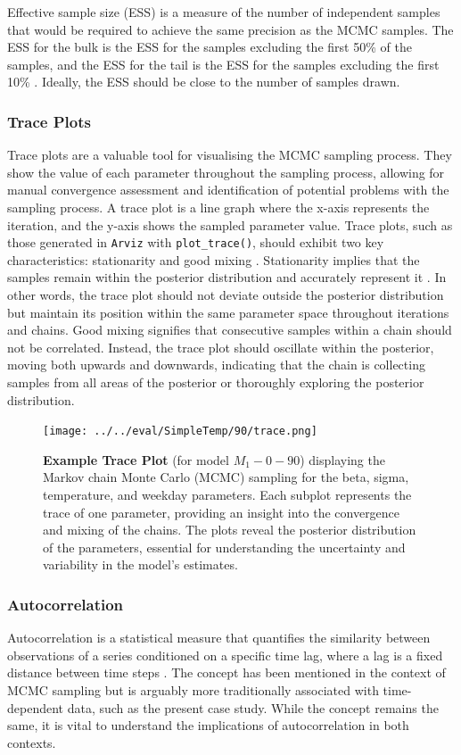 Effective sample size (ESS) is a measure of the number of independent samples
that would be required to achieve the same precision as the MCMC samples. The
ESS for the bulk is the ESS for the samples excluding the first 50\% of the
samples, and the ESS for the tail is the ESS for the samples excluding the
first 10\% \cite{statrethinking}. Ideally, the ESS should be close to the
number of samples drawn. 
\subsubsection{Trace Plots}
Trace plots are a valuable tool for visualising the MCMC sampling process. They 
show the value of each parameter throughout the sampling process, 
allowing for manual convergence assessment and identification of potential problems with
the sampling process.
A trace plot is a line graph where the x-axis represents the iteration, and the
y-axis shows the sampled parameter value. Trace plots, such as those generated
in \texttt{Arviz} with \texttt{plot\_trace()}, should exhibit two key
characteristics: stationarity and good mixing \cite{statrethinking}.
Stationarity implies that the samples remain within the posterior distribution
and accurately represent it \cite{puppies}. In other words, the trace plot
should not deviate outside the posterior distribution but maintain its position
within the same parameter space throughout iterations and chains. Good mixing
signifies that consecutive samples within a chain should not be correlated.
Instead, the trace plot should oscillate within the posterior, moving both
upwards and downwards, indicating that the chain is collecting samples from all
areas of the posterior or thoroughly exploring the posterior distribution. 
\begin{figure}
  \begin{center}
    \texttt{[image: ../../eval/SimpleTemp/90/trace.png]}
  \end{center}
  \caption{\textbf{Example Trace Plot} (for model $M_1{-}0{-}90$) displaying the Markov chain Monte Carlo (MCMC) sampling for the beta, sigma, temperature, and weekday parameters. Each subplot represents the trace of one parameter, providing an insight into the convergence and mixing of the chains. The plots reveal the posterior distribution of the parameters, essential for understanding the uncertainty and variability in the model's estimates.}
  \label{fig:trace-plot}
\end{figure}
\subsubsection{Autocorrelation} 
Autocorrelation is a statistical measure that quantifies the similarity between
observations of a series conditioned on a specific time lag, where a lag is a
fixed distance between time steps \cite{time-series2}. The concept has been mentioned in the
context of MCMC sampling but is arguably more traditionally associated with
time-dependent data, such as the present case study. While the concept remains
the same, it is vital to understand the implications of autocorrelation in both
contexts.


